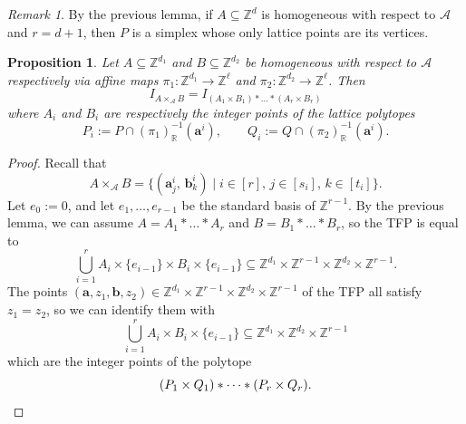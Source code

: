 \documentclass[12pt,reqno]{amsart}   	%
\theoremstyle{plain}
\newtheorem{proposition}[theorem]{Proposition}
\newtheorem{corollary}[theorem]{Corollary}
\theoremstyle{definition}
\theoremstyle{remark}
\newtheorem{remark}[theorem]{Remark}
\newcommand{\Z}{\mathbb{Z}}
\newcommand{\R}{\mathbb{R}}
\begin{document}

\begin{remark} \label{remark:simplex}
    By the previous lemma, if $A \subseteq \Z^d$ is homogeneous with respect to $\mathcal{A}$ and $r=d+1$, then $P$ is a simplex whose only lattice points are its vertices. 
\end{remark}

\begin{proposition}\label{prop:TFP_factorizes_as_Cayley_sum}
    Let $A \subseteq \Z^{d_1}$ and $B \subseteq \Z^{d_2}$ be homogeneous with respect to $\mathcal{A}$ respectively via affine maps $\pi_1: \Z^{d_1} \to \Z^{\ell}$ and $\pi_2: \Z^{d_2} \to \Z^{\ell}$.
    Then 
    \[
       I_{A \times_{\mathcal{A}} B} = I_{(A_1 \times B_1)*\dots*(A_r \times B_r)}
    \]
    where $A_i$ and $B_i$ are respectively the integer points of the lattice polytopes 
    \[
    P_i := P \cap (\pi_1)_{\R}^{-1}(\mathbf{a}^i),\qquad Q_i := Q \cap (\pi_2)_{\R}^{-1}(\mathbf{a}^i).
    \]
\end{proposition}
\begin{proof}
    Recall that
    \[
    {A \times_{\mathcal{A}}B} = \{ (\mathbf{a}^i_j,\,\mathbf{b}^i_k)\mid i \in [r],\, j \in [s_i],\, k \in [t_i]\}.
    \]
    Let $e_0 := 0$, and let $e_1,\dots,e_{r-1}$ be the standard basis of $\Z^{r-1}$. By the previous lemma, we can assume $A = A_1*\dots*A_r$ and $B=B_1*\dots*B_r$, so the TFP is equal to
    \[
    \bigcup_{i=1}^r A_i \times \{e_{i-1}\} \times B_i \times \{e_{i-1}\} \subseteq \Z^{d_1} \times \Z^{r-1} \times \Z^{d_2} \times \Z^{r-1}.
    \]
    The points $(\mathbf{a},z_1, \mathbf{b},z_2) \in  \Z^{d_1} \times \Z^{r-1} \times \Z^{d_2} \times \Z^{r-1}$ of the TFP all satisfy $z_1 = z_2$, so we can identify them with
    \[
    \bigcup_{i=1}^r A_i  \times B_i \times \{e_{i-1}\} \subseteq \Z^{d_1} \times \Z^{d_2} \times \Z^{r-1}
    \]
    which are the integer points of the polytope
    \[
    (P_1 \times Q_1)*\dots*(P_r \times Q_r). \qedhere
    \]
\end{proof}
\end{document}
